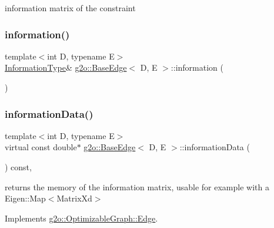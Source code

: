 information matrix of the constraint 

\mbox{\label{classg2o_1_1_base_edge_addff9120320d63504e07bfe17f1d04a7}} 
\subsubsection{\texorpdfstring{information()}{information()}\hspace{0.1cm}{\footnotesize\ttfamily [2/2]}}
{\footnotesize\ttfamily template$<$int D, typename E$>$ \\
\mbox{\hyperlink{classg2o_1_1_base_edge_a2e5a33343ac3f189d8a7d5ee4d8b73fc}{Information\+Type}}\& \mbox{\hyperlink{classg2o_1_1_base_edge}{g2o\+::\+Base\+Edge}}$<$ D, E $>$\+::information (\begin{DoxyParamCaption}{ }\end{DoxyParamCaption})\hspace{0.3cm}{\ttfamily [inline]}}

\mbox{\label{classg2o_1_1_base_edge_acf02f0d69998b75b207bc102f079d5b8}} 
\subsubsection{\texorpdfstring{information\+Data()}{informationData()}\hspace{0.1cm}{\footnotesize\ttfamily [1/2]}}
{\footnotesize\ttfamily template$<$int D, typename E$>$ \\
virtual const double$\ast$ \mbox{\hyperlink{classg2o_1_1_base_edge}{g2o\+::\+Base\+Edge}}$<$ D, E $>$\+::information\+Data (\begin{DoxyParamCaption}{ }\end{DoxyParamCaption}) const\hspace{0.3cm}{\ttfamily [inline]}, {\ttfamily [virtual]}}



returns the memory of the information matrix, usable for example with a Eigen\+::\+Map$<$\+Matrix\+Xd$>$ 



Implements \mbox{\hyperlink{classg2o_1_1_optimizable_graph_1_1_edge_ab5b315b3e0a6c4e29074b2c924460417}{g2o\+::\+Optimizable\+Graph\+::\+Edge}}.

